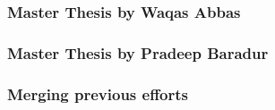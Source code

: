 		\subsubsection{Master Thesis by Waqas Abbas}
		
		\subsubsection{Master Thesis by Pradeep Baradur}
		
		\subsubsection{Merging previous efforts}
		
